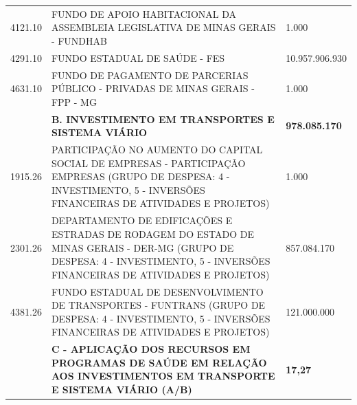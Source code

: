\documentclass{article}
\begin{document}
\begin{longtable}[c]{m{3cm}|m{12cm}|m{3cm}}
\multicolumn{1}{C{3cm}|}{4121.10} & \multicolumn{1}{L{12cm}|}{FUNDO DE APOIO HABITACIONAL DA ASSEMBLEIA LEGISLATIVA DE MINAS GERAIS - FUNDHAB} & \multicolumn{1}{R{3cm}}{1.000} \\
\multicolumn{1}{C{3cm}|}{4291.10} & \multicolumn{1}{L{12cm}|}{FUNDO ESTADUAL DE SAÚDE - FES} & \multicolumn{1}{R{3cm}}{10.957.906.930} \\
\multicolumn{1}{C{3cm}|}{4631.10} & \multicolumn{1}{L{12cm}|}{FUNDO DE PAGAMENTO DE PARCERIAS PÚBLICO - PRIVADAS DE MINAS GERAIS - FPP - MG} & \multicolumn{1}{R{3cm}}{1.000} \\
\hline
\multicolumn{1}{C{3cm}|}{ \textbf{}} & \multicolumn{1}{L{12cm}|}{ \textbf{B. INVESTIMENTO EM TRANSPORTES E SISTEMA VIÁRIO}} & \multicolumn{1}{R{3cm}}{ \textbf{978.085.170}} \\
\multicolumn{1}{C{3cm}|}{1915.26} & \multicolumn{1}{L{12cm}|}{PARTICIPAÇÃO NO AUMENTO DO CAPITAL SOCIAL DE EMPRESAS - PARTICIPAÇÃO EMPRESAS (GRUPO DE DESPESA: 4 - INVESTIMENTO, 5 - INVERSÕES FINANCEIRAS DE ATIVIDADES E PROJETOS)} & \multicolumn{1}{R{3cm}}{1.000} \\
\multicolumn{1}{C{3cm}|}{2301.26} & \multicolumn{1}{L{12cm}|}{DEPARTAMENTO DE EDIFICAÇÕES E ESTRADAS DE RODAGEM DO ESTADO DE MINAS GERAIS - DER-MG (GRUPO DE DESPESA: 4 - INVESTIMENTO, 5 - INVERSÕES FINANCEIRAS DE ATIVIDADES E PROJETOS)} & \multicolumn{1}{R{3cm}}{857.084.170} \\
\multicolumn{1}{C{3cm}|}{4381.26} & \multicolumn{1}{L{12cm}|}{FUNDO ESTADUAL DE DESENVOLVIMENTO DE TRANSPORTES - FUNTRANS (GRUPO DE DESPESA: 4 - INVESTIMENTO, 5 - INVERSÕES FINANCEIRAS DE ATIVIDADES E PROJETOS)} & \multicolumn{1}{R{3cm}}{121.000.000} \\
\hline
\multicolumn{1}{C{3cm}|}{ \textbf{}} & \multicolumn{1}{L{12cm}|}{ \textbf{C - APLICAÇÃO DOS RECURSOS EM PROGRAMAS DE SAÚDE EM RELAÇÃO AOS INVESTIMENTOS EM TRANSPORTE E SISTEMA VIÁRIO (A/B)}} & \multicolumn{1}{R{3cm}}{ \textbf{17,27}} \\\hline\hline\end{longtable}\raggedright\fontsize{7pt}{10pt}\selectfont {FONTE: Armazém Sisor.} \\\fontsize{7pt}{10pt}\selectfont {ELABORAÇÃO: DCAF/SCPPO/SEPLAG}\\\fontsize{7pt}{10pt}\\
\end{document}
